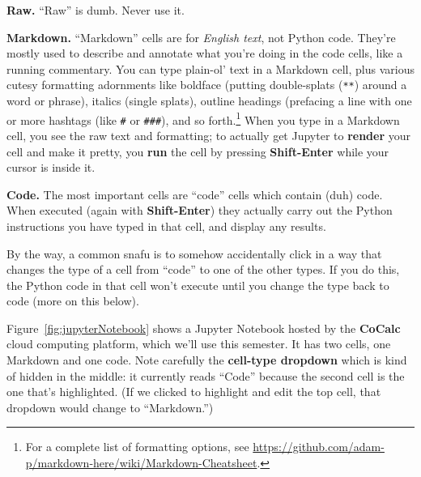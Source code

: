 \begin{description}

\label{cell!raw}
\item{\textbf{Raw.}} ``Raw'' is dumb. Never use it.

\label{Markdown}
\label{render}
\label{cell!Markdown}
\item{\textbf{Markdown.}} ``Markdown'' cells are for \textit{English text}, not Python
code. They're mostly used to describe and annotate what you're doing in the
code cells, like a running commentary. You can type plain-ol' text in a
Markdown cell, plus various cutesy formatting adornments like boldface (putting
double-splats (\texttt{**}) around a word or phrase), italics (single splats),
outline headings (prefacing a line with one or more hashtags (like \texttt{\#}
or \texttt{\#\#\#}), and so forth.\footnote{For a complete list of formatting
options, see
\url{https://github.com/adam-p/markdown-here/wiki/Markdown-Cheatsheet}.} When
you type in a Markdown cell, you see the raw text and formatting; to actually get Jupyter to
\textbf{render} your cell and make it pretty, you \textbf{run} the cell by
pressing \textbf{Shift-Enter} while your cursor is inside it.

\label{cell!code}
\item{\textbf{Code.}} The most important cells are ``code'' cells which contain (duh)
code. When executed (again with \textbf{Shift-Enter}) they actually carry out
the Python instructions you have typed in that cell, and display any results.

\end{description}

By the way, a common snafu is to somehow accidentally click in a way that
changes the type of a cell from ``code'' to one of the other types. If you do
this, the Python code in that cell won't execute until you change the type back
to code (more on this below).

\label{cell!type dropdown}
Figure~\ref{fig:jupyterNotebook} shows a Jupyter Notebook hosted by the
\textbf{CoCalc} cloud computing platform, which we'll use this semester. It has
two cells, one Markdown and one code. Note carefully the \textbf{cell-type
dropdown} which is kind of hidden in the middle: it currently reads ``Code''
because the second cell is the one that's highlighted. (If we clicked to
highlight and edit the top cell, that dropdown would change to ``Markdown.'')

